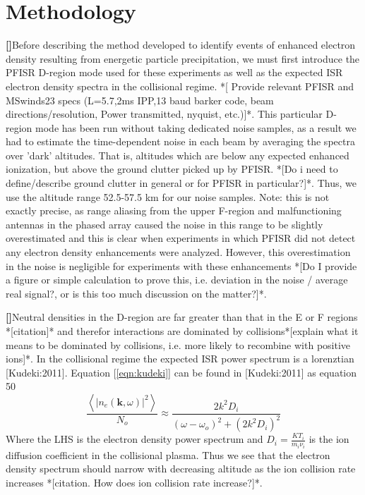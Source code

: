 \documentclass{article}
\newcounter{para}
\newcommand\mypara{\par\refstepcounter{para}\textbf{[\thepara]}\space}
\begin{document}
\section{Methodology}
\mypara Before describing the method developed to identify events of enhanced electron density resulting from energetic particle precipitation, we must first introduce the PFISR D-region mode used for these experiments as well as the expected ISR electron density spectra in the collisional regime. *[ Provide relevant PFISR and MSwinds23 specs (L=5.7,2ms IPP,13 baud barker code, beam directions/resolution, Power transmitted, nyquist, etc.)]*. This particular D-region mode has been run without taking dedicated noise samples, as a result we had to estimate the time-dependent noise in each beam by averaging the spectra over 'dark' altitudes. That is, altitudes which are below any expected enhanced ionization, but above the ground clutter picked up by PFISR. *[Do i need to define/describe ground clutter in general or for PFISR in particular?]*. Thus, we use the altitude range 52.5-57.5 km for our noise samples. Note: this is not exactly precise, as range aliasing from the upper F-region and malfunctioning antennas in the phased array caused the noise in this range to be slightly overestimated and this is clear when experiments in which PFISR did not detect any electron density enhancements were analyzed. However, this overestimation in the noise is negligible for experiments with these enhancements *[Do I provide a figure or simple calculation to prove this, i.e. deviation in the noise / average real signal?, or is this too much discussion on the matter?]*.
\mypara Neutral densities in the D-region are far greater than that in the E or F regions *[citation]* and therefor  interactions are dominated by collisions*[explain what it means to be dominated by collisions, i.e. more likely to recombine with positive ions]*. In the collisional regime the expected ISR power spectrum is a lorenztian [Kudeki:2011]. Equation [\ref{eqn:kudeki}] can be found in [Kudeki:2011] as equation 50
\begin{equation}
	\frac{\left<\left|n_e\left(\textbf{k},\omega\right)\right|^2\right>}{N_o}  \approx \frac{2k^2D_i}{(\omega-\omega_o)^2+\left(2k^2D_i\right)^2} 
	\label{eqn:kudeki}
\end{equation}
Where the LHS is the electron density power spectrum and $D_i=\frac{KT_i}{m_i\nu_i}$ is the ion diffusion coefficient in the collisional plasma. Thus we see that the electron density spectrum should narrow with decreasing altitude as the ion collision rate increases *[citation. How does ion collision rate increase?]*. 
\end{document}
